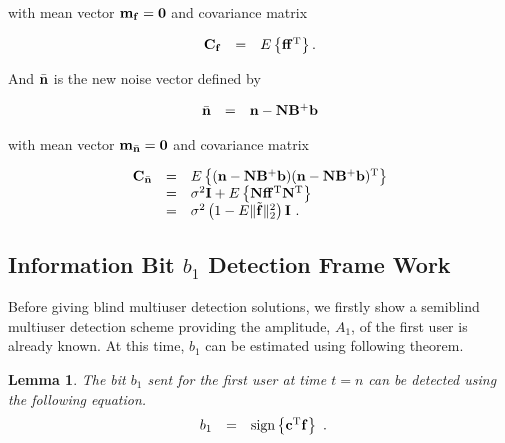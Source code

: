 \documentclass[a4paper,11pt,fleqn]{article}
\newtheorem{lemma}{Lemma}
\newcommand{\bb}{{\bf b}}
\newcommand{\bc}{{\bf c}}
\newcommand{\bC}{{\bf C}}
\newcommand{\bm}{{\bf m}}
\newcommand{\bn}{{\bf n}}
\newcommand{\bbf}{{\bf f}}
\newcommand{\bN}{{\bf N}}
\newcommand{\bI}{{\bf I}}
\newcommand{\bB}{{\bf B}}
\newcommand{\bzero}{{\bf 0}}
\begin{document}
\noindent with mean vector $\bm_{\bbf}=\bzero$ and covariance
matrix

\begin{equation}
\begin{array}{rcl}
\bC_{\bbf}&=&E\left\{\bbf \bbf^{\rm T}\right\}.
\end{array} \label{C_f}
\end{equation}

\noindent And $\bar{\bn}$ is the new noise vector defined by

\begin{equation}
\begin{array}{rcl}
\bar{\bn}&=&\bn-{\bN}\bB^{+}\bb
\end{array} \label{new_noise}
\end{equation}

\noindent with mean vector $\bm_{\bar{\bn}}=\bzero$ and covariance
matrix

\begin{equation}
\begin{array}{rcl}
\bC_{\bar{\bn}}&=&E\left\{(\bn-{\bN}\bB^{+}\bb)(\bn-{\bN}\bB^{+}\bb)^{\rm T}\right\}\\
&=& \sigma^{2}\bI+E\left\{{\bN}\bbf\bbf^{\rm T}{\bN}^{\rm T}\right\}\\
&=&\sigma^2\left(1-E\|\tilde{\bbf}\|_2^2\right)\bI\ .
\end{array} \label{var_n}
\end{equation}

\subsection{Information Bit $b_1$ Detection Frame Work}

Before giving blind multiuser detection solutions, we firstly show
a semiblind multiuser detection scheme providing the amplitude,
$A_1$, of the first user is already known. At this time, $b_1$ can
be estimated using following theorem.


\begin{lemma}
The bit $b_1$ sent for the first user at time $t=n$ can be
detected using the following equation.
\begin{equation}
\begin{array}{rcl}
b_1 &=& \mbox{sign}\left\{\bc^{\rm T}\bbf\right\}
\end{array}.
\end{equation} \label{bn_estimation}
\end{lemma}
\end{document}
